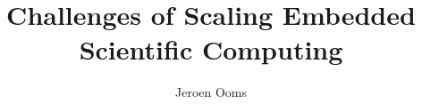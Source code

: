 \documentclass[PhD]{uclathes}\usepackage[]{graphicx}\usepackage[]{color}
\title{Challenges of Scaling Embedded Scientific Computing}
\author{Jeroen Ooms}
\begin{document}
\makeintropages












\end{document}
